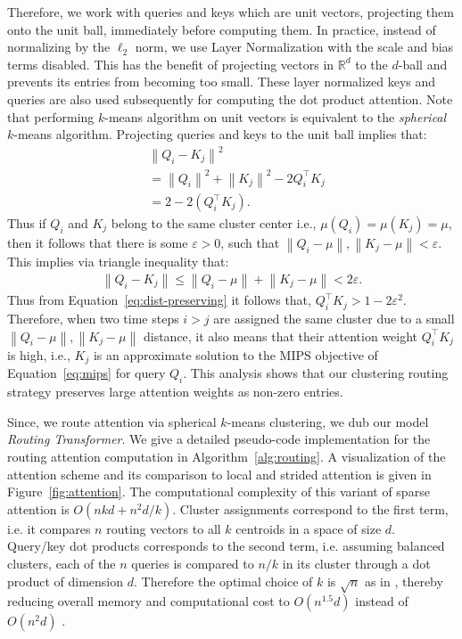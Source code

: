 \documentclass[a4paper]{article}
\newcommand{\norm}[1]{\left\lVert#1\right\rVert}
\begin{document}
Therefore, we work with queries and keys 
which are unit vectors, projecting them onto the
unit ball, immediately before computing them.
In practice, instead of normalizing by the \(\ell_2\) norm, we 
use Layer Normalization \citep{layernorm2016} with the scale and bias
terms disabled. This has the benefit of projecting vectors in \(\mathbb{R}^d\) to the 
\(d\)-ball and prevents its entries from becoming too small. 
These layer normalized keys and queries are also
used subsequently for computing the dot product attention.
Note that performing \(k\)-means algorithm on unit vectors 
is equivalent to the \emph{spherical} \(k\)-means algorithm. 
Projecting queries and keys to the unit ball implies that:
\begin{align}
    &\norm{Q_i - K_j}^2\\
    &= \norm{Q_i}^2 + \norm{K_j}^2 - 2Q_i^\top K_j \\
    &=  2 - 2\left(Q_i^\top K_j\right).\label{eq:dist-preserving}
\end{align}
Thus if \(Q_i\) and \(K_j\) belong to the same cluster center 
i.e., \(\mu(Q_i) = \mu(K_j) = \mu\),
then it follows that there is some \(\varepsilon > 0\), such
that \(\norm{Q_i - \mu}, \norm{K_j - \mu} < \varepsilon\).
This implies via triangle inequality that:
\begin{align}
    \norm{Q_i - K_j} \le \norm{Q_i - \mu} + \norm{K_j - \mu} < 2\varepsilon.
\end{align}
Thus from Equation~\ref{eq:dist-preserving} it follows that,
\(Q_i^\top K_j > 1 - 2\varepsilon^2\).
Therefore, when two time steps $i > j$ are assigned the same cluster due to 
a small $\norm{Q_i - \mu}, \norm{K_j - \mu}$ distance, 
it also means that their attention weight
$Q_i^\top K_j$ is high, i.e., \(K_j\) is an approximate solution
to the MIPS objective of Equation~\ref{eq:mips} for query \(Q_i\). 
This analysis shows that our clustering routing strategy 
preserves large attention weights as non-zero entries.

Since, we route attention via spherical \(k\)-means clustering, we dub our model 
\emph{Routing Transformer}. We give a detailed pseudo-code
implementation for the routing attention computation
in Algorithm~\ref{alg:routing}.
A visualization of the attention scheme
and its comparison to local and strided attention is given 
in Figure~\ref{fig:attention}. The computational complexity of this 
variant of sparse attention is \(O(nkd + n^2d/k)\). 
Cluster assignments correspond to the first term, i.e. 
it compares $n$ routing vectors to all $k$ centroids in 
a space of size $d$. Query/key dot products corresponds to 
the second term, i.e. assuming balanced clusters, each
of the $n$ queries is compared to $n/k$ in its cluster
through a dot product of dimension $d$. Therefore the optimal 
choice of \(k\) is \(\sqrt{n}\) as in \cite{child2019generating}, 
thereby reducing overall memory and computational
cost to \(O\left(n^{1.5}d\right)\) instead of \(O(n^2d)\) 
\citep{vaswani2017attention}.
\end{document}
